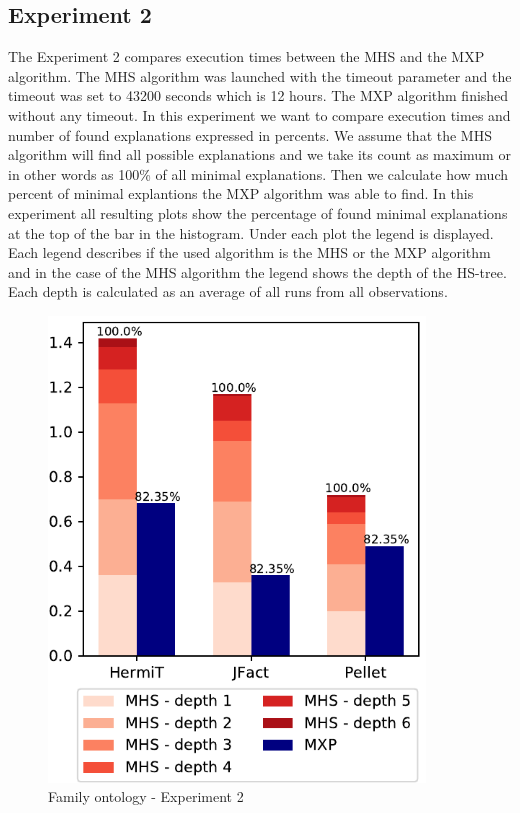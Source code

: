 \documentclass[12pt,a4paper]{article}
\begin{document}
\subsection{Experiment 2}
The Experiment 2 compares execution times between the MHS and the MXP algorithm. The MHS algorithm was launched with the timeout parameter and the timeout was set to 43200 seconds which is 12 hours. The MXP algorithm finished without any timeout. In this experiment we want to compare execution times and number of found explanations expressed in percents. We assume that the MHS algorithm will find all possible explanations and we take its count as maximum or in other words as 100\% of all minimal explanations. Then we calculate how much percent of minimal explantions the MXP algorithm was able to find. In this experiment all resulting plots show the percentage of found minimal explanations at the top of the bar in the histogram. Under each plot the legend is displayed. Each legend describes if the used algorithm is the MHS or the MXP algorithm and in the case of the MHS algorithm the legend shows the depth of the HS-tree. Each depth is calculated as an average of all runs from all observations.

\begin{figure}[H]
	\centering
	\includegraphics[width=10cm]{eval2Family} 	
	\caption{Family ontology - Experiment 2}
	\label{fig:eval2Family}
\end{figure}
\end{document}
